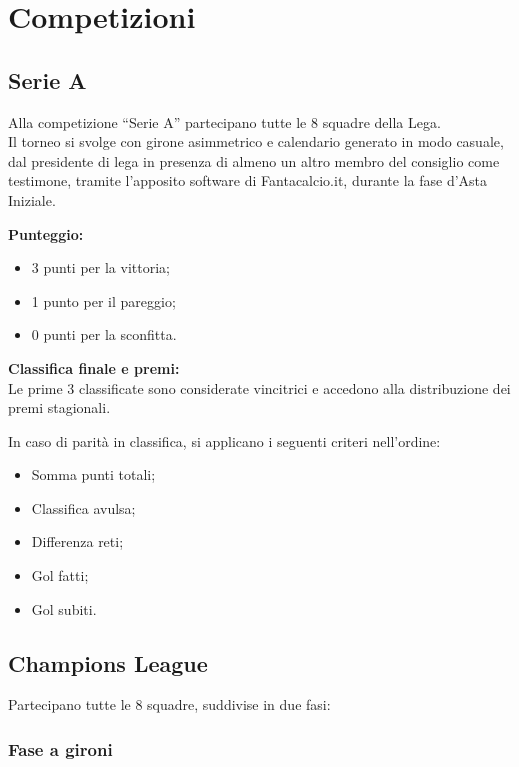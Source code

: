\chapter{Competizioni}
\label{cap:competizioni}

\section{Serie A}
\label{art:9.1}

Alla competizione “Serie A” partecipano tutte le 8 squadre della Lega.\\
Il torneo si svolge con girone asimmetrico e calendario generato in modo casuale, dal presidente di lega in presenza di almeno un altro membro del consiglio come testimone, tramite l'apposito software di Fantacalcio.it, durante la fase d'Asta Iniziale.

\noindent \textbf{Punteggio:}
\begin{itemize}
\item 3 punti per la vittoria;
\item 1 punto per il pareggio;
\item 0 punti per la sconfitta.
\end{itemize}

\noindent \textbf{Classifica finale e premi:}\\
Le prime 3 classificate sono considerate vincitrici e accedono alla distribuzione dei premi stagionali.

\noindent
In caso di parità in classifica, si applicano i seguenti criteri nell'ordine:
\begin{itemize}
\item Somma punti totali;
\item Classifica avulsa;
\item Differenza reti;
\item Gol fatti;
\item Gol subiti.
\end{itemize}

\section{Champions League}
\label{art:9.2}
\noindent Partecipano tutte le 8 squadre, suddivise in due fasi:

\subsection{Fase a gironi}
\label{art:9.2.1}

